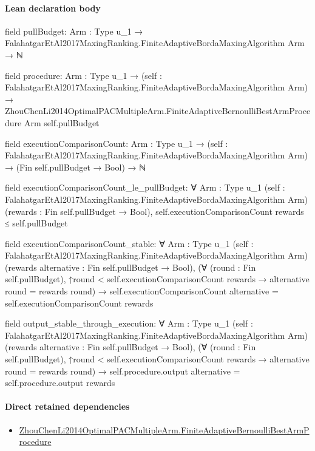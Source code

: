 \documentclass[10pt]{article}
\begin{document}
\paragraph{Lean declaration body}
\begin{ReviewVerbatim}
field pullBudget:
{Arm : Type u_1} → FalahatgarEtAl2017MaxingRanking.FiniteAdaptiveBordaMaxingAlgorithm Arm → ℕ

field procedure:
{Arm : Type u_1} →
  (self : FalahatgarEtAl2017MaxingRanking.FiniteAdaptiveBordaMaxingAlgorithm Arm) →
    ZhouChenLi2014OptimalPACMultipleArm.FiniteAdaptiveBernoulliBestArmProcedure Arm self.pullBudget

field executionComparisonCount:
{Arm : Type u_1} →
  (self : FalahatgarEtAl2017MaxingRanking.FiniteAdaptiveBordaMaxingAlgorithm Arm) → (Fin self.pullBudget → Bool) → ℕ

field executionComparisonCount_le_pullBudget:
∀ {Arm : Type u_1} (self : FalahatgarEtAl2017MaxingRanking.FiniteAdaptiveBordaMaxingAlgorithm Arm)
  (rewards : Fin self.pullBudget → Bool), self.executionComparisonCount rewards ≤ self.pullBudget

field executionComparisonCount_stable:
∀ {Arm : Type u_1} (self : FalahatgarEtAl2017MaxingRanking.FiniteAdaptiveBordaMaxingAlgorithm Arm)
  (rewards alternative : Fin self.pullBudget → Bool),
  (∀ (round : Fin self.pullBudget),
      ↑round < self.executionComparisonCount rewards → alternative round = rewards round) →
    self.executionComparisonCount alternative = self.executionComparisonCount rewards

field output_stable_through_execution:
∀ {Arm : Type u_1} (self : FalahatgarEtAl2017MaxingRanking.FiniteAdaptiveBordaMaxingAlgorithm Arm)
  (rewards alternative : Fin self.pullBudget → Bool),
  (∀ (round : Fin self.pullBudget),
      ↑round < self.executionComparisonCount rewards → alternative round = rewards round) →
    self.procedure.output alternative = self.procedure.output rewards
\end{ReviewVerbatim}

\paragraph{Direct retained dependencies}
\begin{itemize}\raggedright
\item \hyperlink{governing-declaration-b72dda6eba0cdd80}{Zhou\allowbreak{}Chen\allowbreak{}Li2014\allowbreak{}Optimal\allowbreak{}PAC\allowbreak{}Multiple\allowbreak{}Arm.\allowbreak{}Finite\allowbreak{}Adaptive\allowbreak{}Bernoulli\allowbreak{}Best\allowbreak{}Arm\allowbreak{}Procedure}
\end{itemize}
\hypertarget{governing-declaration-8bf2cad4b204a162}{}
\end{document}
